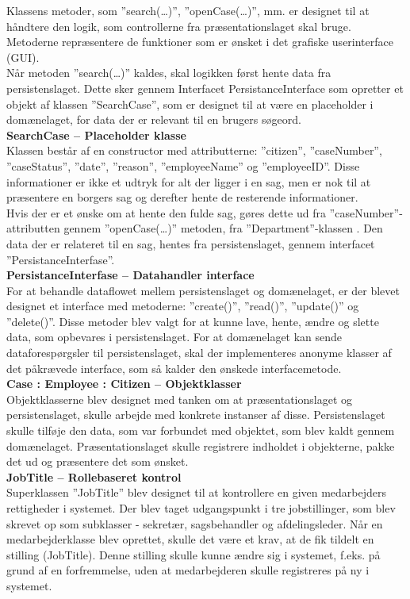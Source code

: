 Klassens metoder, som ”search(…)”, ”openCase(…)”, mm. er designet til at håndtere den logik, som controllerne fra præsentationslaget skal bruge. Metoderne repræsentere de funktioner som er ønsket i det grafiske userinterface (GUI).\\
Når metoden ”search(…)” kaldes, skal logikken først hente data fra persistenslaget. Dette sker gennem Interfacet PersistanceInterface som opretter et objekt af klassen ”SearchCase”, som er designet til at være en placeholder i domænelaget, for data der er relevant til en brugers søgeord.\\
\textbf{SearchCase – Placeholder klasse}\\
Klassen består af en constructor med attributterne: ”citizen”, ”caseNumber”, ”caseStatus”, ”date”, ”reason”, ”employeeName” og ”employeeID”. Disse informationer er ikke et udtryk for alt der ligger i en sag, men er nok til at præsentere en borgers sag og derefter hente de resterende informationer. \\
Hvis der er et ønske om at hente den fulde sag, gøres dette ud fra ”caseNumber”-attributten gennem ”openCase(…)” metoden, fra ”Department”-klassen . Den data der er relateret til en sag, hentes fra persistenslaget, gennem interfacet ”PersistanceInterfase”.\\
\textbf{PersistanceInterfase – Datahandler interface}\\
For at behandle dataflowet mellem persistenslaget og domænelaget, er der blevet designet et interface med metoderne: ”create()”, ”read()”, ”update()” og ”delete()”. Disse metoder blev valgt for at kunne lave, hente, ændre og slette data, som opbevares i persistenslaget. For at domænelaget kan sende dataforespørgsler til persistenslaget, skal der implementeres anonyme klasser af det påkrævede interface, som så kalder den ønskede interfacemetode.\\ 
\textbf{Case : Employee : Citizen – Objektklasser}\\
Objektklasserne blev designet med tanken om at præsentationslaget og persistenslaget, skulle arbejde med konkrete instanser af disse. Persistenslaget skulle tilføje den data, som var forbundet med objektet, som blev kaldt gennem domænelaget. Præsentationslaget skulle registrere indholdet i objekterne, pakke det ud og præsentere det som ønsket. \\
\textbf{JobTitle – Rollebaseret kontrol}\\
Superklassen ”JobTitle” blev designet til at kontrollere en given medarbejders rettigheder i systemet. Der blev taget udgangspunkt i tre jobstillinger, som blev skrevet op som subklasser - sekretær, sagsbehandler og afdelingsleder. Når en medarbejderklasse blev oprettet, skulle det være et krav, at de fik tildelt en stilling (JobTitle). Denne stilling skulle kunne ændre sig i systemet, f.eks. på grund af en forfremmelse, uden at medarbejderen skulle registreres på ny i systemet.\\
